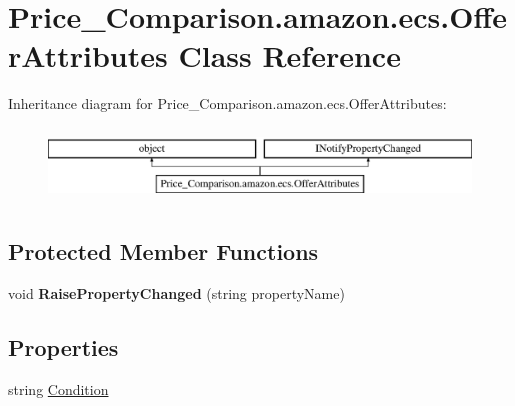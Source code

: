 \hypertarget{class_price___comparison_1_1amazon_1_1ecs_1_1_offer_attributes}{\section{Price\-\_\-\-Comparison.\-amazon.\-ecs.\-Offer\-Attributes Class Reference}
\label{class_price___comparison_1_1amazon_1_1ecs_1_1_offer_attributes}
}


 


Inheritance diagram for Price\-\_\-\-Comparison.\-amazon.\-ecs.\-Offer\-Attributes\-:\begin{figure}[H]
\begin{center}
\leavevmode
\includegraphics[height=1.985816cm]{class_price___comparison_1_1amazon_1_1ecs_1_1_offer_attributes}
\end{center}
\end{figure}
\subsection*{Protected Member Functions}
\begin{DoxyCompactItemize}
\item 
\hypertarget{class_price___comparison_1_1amazon_1_1ecs_1_1_offer_attributes_aabd471ae643d84595eeecbe0bf812cc1}{void {\bfseries Raise\-Property\-Changed} (string property\-Name)}\label{class_price___comparison_1_1amazon_1_1ecs_1_1_offer_attributes_aabd471ae643d84595eeecbe0bf812cc1}

\end{DoxyCompactItemize}
\subsection*{Properties}
\begin{DoxyCompactItemize}
\item 
\hypertarget{class_price___comparison_1_1amazon_1_1ecs_1_1_offer_attributes_acb6ce206d14d6ae5327e70713c52d702}{string \hyperlink{class_price___comparison_1_1amazon_1_1ecs_1_1_offer_attributes_acb6ce206d14d6ae5327e70713c52d702}{Condition}}\label{class_price___comparison_1_1amazon_1_1ecs_1_1_offer_attributes_acb6ce206d14d6ae5327e70713c52d702}

\begin{DoxyCompactList}\small\item\em \end{DoxyCompactList}\end{DoxyCompactItemize}

